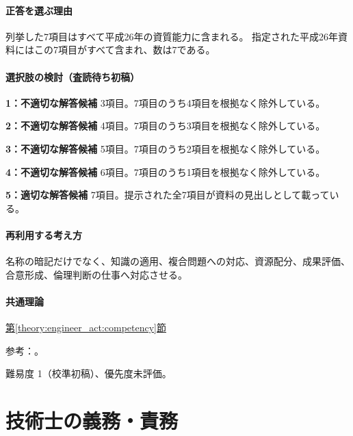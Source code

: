 \paragraph{正答を選ぶ理由} 列挙した7項目はすべて平成26年の資質能力に含まれる。 指定された平成26年資料にはこの7項目がすべて含まれ、数は7である。

\paragraph{選択肢の検討（査読待ち初稿）}\mbox{}\par

\noindent\textbf{1：不適切な解答候補} 3項目。7項目のうち4項目を根拠なく除外している。\par

\noindent\textbf{2：不適切な解答候補} 4項目。7項目のうち3項目を根拠なく除外している。\par

\noindent\textbf{3：不適切な解答候補} 5項目。7項目のうち2項目を根拠なく除外している。\par

\noindent\textbf{4：不適切な解答候補} 6項目。7項目のうち1項目を根拠なく除外している。\par

\noindent\textbf{5：適切な解答候補} 7項目。提示された全7項目が資料の見出しとして載っている。\par

\paragraph{再利用する考え方} 名称の暗記だけでなく、知識の適用、複合問題への対応、資源配分、成果評価、合意形成、倫理判断の仕事へ対応させる。

\paragraph{共通理論} \hyperref[theory:engineer_act:competency]{第\ref*{theory:engineer_act:competency}節}

\par 参考：\cite{mext_competency2014}。

\par 難易度 1（校準初稿）、優先度未評価。

\section{技術士の義務・責務}

